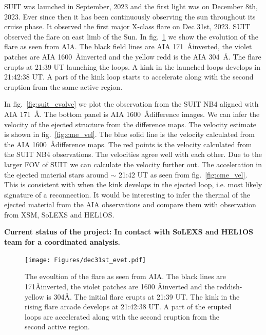 \documentclass[a4paper,11pt]{article}
\begin{document}
SUIT was launched in September, 2023 and the first light was on December 8th, 2023. Ever since then it has been continuously observing the sun throughout its cruise phase. It observed the first major X-class flare on Dec 31st, 2023. SUIT observed the flare on east limb of the Sun. In fig.~\ref{fig:aia_evolve} we show the evolution of the flare as seen from AIA. The black field lines are AIA 171~\AA inverted, the violet patches are AIA 1600~\AA inverted and the yellow redd is the AIA 304~\AA. The flare erupts at 21:39 UT launching the loops. A kink in the launched loops develops in 21:42:38 UT. A part of the kink loop starts to accelerate along with the second eruption from the same active region. 

In fig.~\ref{fig:suit_evolve} we plot the observation from the SUIT NB4 aligned with AIA 171~\AA. The bottom panel is AIA 1600~\AA difference images. We can infer the velocity of the ejected structure from the difference maps. The velocity estimate is shown in fig.~\ref{fig:cme_vel}. The blue solid line is the velocity calculated from the AIA 1600~\AA difference maps. The red points is the velocity calculated from the SUIT NB4 observations. The velocities agree well with each other. Due to the larger FOV of SUIT we can calculate the velocity further out. 
The acceleration in the ejected material stars around $\sim$ 21:42 UT as seen from fig.~\ref{fig:cme_vel}. This is consistent with when the kink develops in the ejected loop, i.e. most likely signature of a reconnection. It would be interesting to infer the thermal  of the ejected material from the AIA observations and compare them with observation from XSM, SoLEXS and HEL1OS.

\textbf{Current status of the project: In contact with SoLEXS and HEL1OS team for a coordinated analysis.}

\begin{figure}[ht!]
    \centering
    \texttt{[image: Figures/dec31st\_evet.pdf]}
    \caption{The evoultion of the flare as seen from AIA. The black lines are 171\AA inverted, the violet patches are 1600 \AA inverted and the reddish-yellow is 304\AA. The initial flare erupts at 21:39 UT. The kink in the rising flare arcade develops at 21:42:38 UT. A part of the erupted loops are accelerated along with the second eruption from the second active region.}
    \label{fig:aia_evolve}
    \end{figure}
\end{document}
